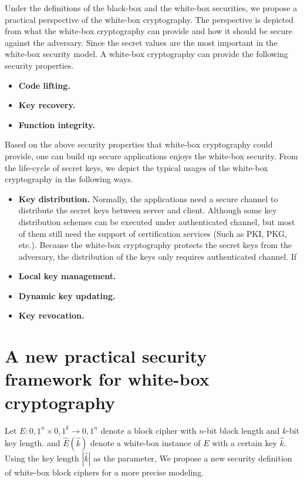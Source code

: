 \documentclass{SCIS2018}
\begin{document}
Under the definitions of the black-box and the white-box securities, we propose a practical perspective of the white-box cryptography. The perspective is depicted from what the white-box cryptography can provide and how it should be secure against the adversary. Since the secret values are the most important in the white-box security model. A white-box cryptography can provide the following security properties.

\begin{itemize}
\item \textbf{Code lifting.}

\item \textbf{Key recovery.}

\item \textbf{Function integrity.}

\end{itemize}

Based on the above security properties that white-box cryptography could provide, one can build  up secure applications enjoys the white-box security. From the life-cycle of secret keys, we depict the typical usages of the white-box cryptography in the following ways.

\begin{itemize}
\item \textbf{Key distribution.} Normally, the applications need a secure channel to distribute the secret keys between server and client. Although some key distribution schemes can be executed under authenticated channel, but most of them still need the support of certification services (Such as PKI, PKG, etc.). Because the white-box cryptography protects the secret keys from the adversary, the distribution of the keys only requires authenticated channel. If

\item \textbf{Local key management.}

\item \textbf{Dynamic key updating.}

\item \textbf{Key revocation.}
\end{itemize}

\section{A new practical security framework for white-box cryptography}

Let $E:{0,1}^{n}\times{0,1}^{k}\rightarrow{0,1}^{n}$ denote a block cipher with $n$-bit block length and $k$-bit key length. and $\hat{E}(\hat{k})$ denote a white-box instance of $E$ with a certain key $\hat{k}$. Using the key length $|\hat{k}|$ as the parameter, We propose a new security definition of white-box block ciphers for a more precise modeling.
\end{document}
